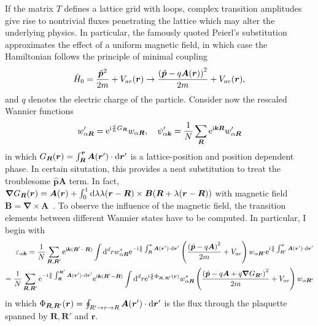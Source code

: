 If the matrix $T$ defines a lattice grid with loops, complex transition amplitudes give rise to nontrivial fluxes penetrating the lattice which may alter the underlying physics.
In particular, the famously quoted Peierl's substitution approximates the effect of a uniform magnetic field, in which case the Hamiltonian follows the principle of minimal coupling
\begin{align}
    \hat H_0 = \frac{\hat{\bm p}^2}{2m}+V_{ae}(\bm r)\rightarrow \frac{\left( \hat{\bm p} - q\bm A(\bm r) \right)^2}{2m}+V_{ae}(\bm r),
\end{align}
and $q$ denotes the electric charge of the particle.
Consider now the rescaled Wannier functions
\begin{align}
    w'_{\alpha\bm R} = \mathrm e^{\mathrm i\frac q\hbar G_{\bm R}}w_{\alpha\bm R},
    \quad
    \psi'_{\alpha\bm k} = \frac1N\sum_{\bm R}\mathrm e^{\mathrm i\bm k\bm R}w'_{\alpha\bm R}
\end{align}
in which $G_{\bm R}(\bm r) = \int_{\bm R}^{\bm r}\bm A(\bm r')\cdot\mathrm d \bm r'$ is a lattice-position and position dependent phase.
In certain situtation, this provides a neat substitution to treat the troublesome $\hat{\bm p}\bm A$ term.
In fact, $\bm\nabla G_{\bm R}(\bm r) = \bm A(\bm r) + \int_0^1\mathrm d\lambda\lambda (\bm r-\bm R)\times\bm B(\bm R+\lambda(\bm r-\bm R))$ with magnetic field $\bm B=\bm\nabla\times\bm A$~\cite{Luttinger1951}.
To observe the influence of the magnetic field, the transition elements between different Wannier states have to be computed.
In particular, I begin with
\begin{align}
    \varepsilon_{\alpha\bm k}
    =
    \frac1N\sum_{\bm R,\bm R'}\mathrm e^{\mathrm i\bm k(\bm R'-\bm R)}
    \int\mathrm d^d r
        w_{\alpha\bm R}^*
        \mathrm e^{-\mathrm i\frac q\hbar\int_{\bm R}^{\bm r}\bm A(\bm r')\cdot\mathrm d \bm r'}
        \left( \frac{\left( \hat{\bm p}-q\bm A \right)^2}{2m}+V_{ae} \right)
        w_{\alpha \bm R'}
        \mathrm e^{\mathrm i\frac q\hbar\int_{\bm R'}^{\bm r}\bm A(\bm r')\cdot\mathrm d \bm r'}
    \\
    =
    \frac1N\sum_{\bm R,\bm R'}\mathrm e^{-\mathrm i\frac q\hbar\int_{\bm R}^{\bm R'}\bm A(\bm r')\cdot\mathrm d \bm r'}\mathrm e^{\mathrm i\bm k(\bm R'-\bm R)}
    \int\mathrm d^d r
        \mathrm e^{\mathrm i\frac q\hbar\Phi_{\bm R,\bm R'}(\bm r)}
        w_{\alpha\bm R}^*
        \left( \frac{\left( \hat{\bm p}-q\bm A+q\bm\nabla G_{\bm R'} \right)^2}{2m}+V_{ae} \right)
        w_{\alpha \bm R'}
\end{align}
in which $\Phi_{\bm R,\bm R'}(\bm r) = \oint_{R'\rightarrow r\rightarrow R}\bm A(\bm r')\cdot\mathrm d \bm r'$ is the flux through the plaquette spanned by $\bm R, \bm R'$ and $\bm r$.
